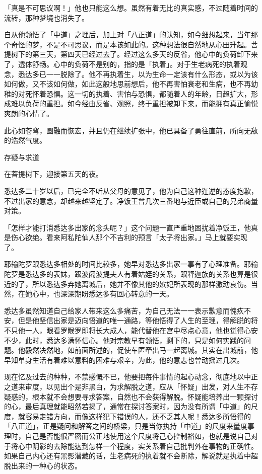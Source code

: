 \documentclass[12pt,twoside,openany]{book}
\begin{document}
「真是不可思议啊！」他也只能这么想。虽然有着无比的真实感，不过随着时间的流转，那种梦境也消失了。

自从他领悟了「中道」之理后，加上对「八正道」的认知，如今细想起来，当年那个奇怪的梦，不是不可思议，而是本该如此的。这种想法很自然地从心田升起。菩提树下的第三天，第四天已经过去了。经过这么多天的反省，他心中的负荷卸下来了，透体舒畅。心中的负荷不是别的，指的是「执着」。对于生老病死的执着观念，悉达多已一一脱除了。他不再执着生，以为生命一定该有什么形态，或以为该如何做，又不该如何做，如此这般地思前想后，他不再害怕衰老和生病，也不再幼稚的对死怀着恐惧。这一切的执着、害怕与恐惧，都随着人的年龄，日趋扩大，形成难以负荷的重担。如今经由反省、观照，终于重担被卸下来，而能拥有真正愉悦爽朗的心情了。

此心如苍穹，圆融而恢宏，并且仍在继续扩张中，他已具备了勇往直前，所向无敌的浩然气度。

存疑与求道

在菩提树下，迎接第五天的夜。

悉达多二十岁以后，已完全不听从父母的意见了，他为自己这种迕逆的态度抱歉，不过出家的意念，却越来越坚定了。净饭王曾几次三番地与近臣或自己的兄弟商量对策。

「怎样才能打消悉达多出家的念头呢？」这个问题一直严重地困扰着净饭王，他真是伤心欲绝。看来阿私陀仙人那个不吉利的预言「太子将出家。」马上就要实现了。

耶输陀罗跟悉达多相处的时间比较多，她早对悉达多出家一事有了心理准备。耶输陀罗是悉达多的表妹，跟波阇波提夫人有着姑姪的关系，跟释迦族的关系也算是很近的了，所以悉达多弃她离城后，她并不像其他的嫔妃所表现的那样激动哀伤。当然，在她心中，也深深期盼悉达多有回心转意的一天。

悉达多虽然知道自己给家人带来这么多痛苦，为自己无法一一表示歉意而愧疚不安，但是他坚信出家是迈向悟道的唯一通路，等他悟得了人生的至理，得解脱的将不只他一人，眼看罗睺罗即将长大成人，能代替他在宫中尽点心意，他也觉得心安不少，此时，悉达多满怀信心。他对宗教早有领悟，剩下的，只是如何实践的问题。他毅然决然地，如前面所述的，促使车匿牵出马一起离城。其实在出城前，他早知单身生活有着难以意料的困难与艰辛，为此，他的意志也曾动摇过几次。

现在忆及过去的种种，不禁感慨不已，他要把每件事情的起心动念，彻底地以中正之道来审度，以见出个是非黑白，为求解脱之道，应从「怀疑」出发，对人生不存疑惑的，根本就不会想要寻求答案，自然也不会获得解脱。怀疑能培养出一颗探讨的心，最后真理就能昭然若揭了，通常在探讨答案时，因为没有所谓「中道」的尺度，就容易走错方向，而像这样犯下错误的人，还不乏其人呢！悉达多所悟得的「八正道」，正是疑问和解答之间的桥梁，只是当你执持「中道」的尺度来量度事理时，自己是否能很严密而公正地使用这个尺度将己心控制裕如，也就是说自己对于将心中阴影的去除能达到怎样一个程度，实关系着自己批判外在事物的正确性。如果自己内心还有黑影潜藏的话，生老病死的执着就不会断除，解说就是执着中超脱出来的一种心的状态。
\end{document}

